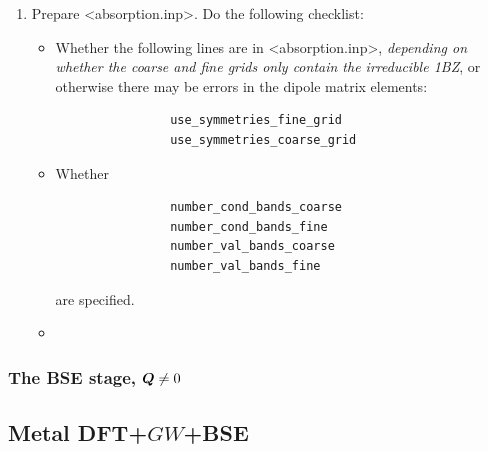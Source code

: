 \documentclass[hyperref, a4paper, 12pt]{report}
\def\texttt#1{<#1>}%
\newcommand{\shortcode}[1]{\texttt{#1}}
\begin{document}
\begin{enumerate}
\begin{enumerate}
        the documentation of BerkeleyGW says we need the files but it's wrong:
        When \shortcode{bsemat.h5} is present, the program runs well.
        \item Prepare \shortcode{absorption.inp}. Do the following checklist:
        \begin{itemize}
            \item Whether the following lines are in \shortcode{absorption.inp}, \emph{depending on whether the coarse and fine grids only contain the irreducible 1BZ}, or otherwise there may be errors in the dipole matrix elements:
            \begin{lstlisting}
                use_symmetries_fine_grid
                use_symmetries_coarse_grid
            \end{lstlisting}
            \item Whether 
            \begin{lstlisting}
                number_cond_bands_coarse
                number_cond_bands_fine
                number_val_bands_coarse
                number_val_bands_fine
            \end{lstlisting}
            are specified.
            \item 
        \end{itemize}
    \end{enumerate}
\end{enumerate}

\subsubsection{The BSE stage, $\vb*{Q} \neq 0$}



\subsection{Metal DFT+$GW$+BSE}\label{sec:metal-sop}
\end{document}
